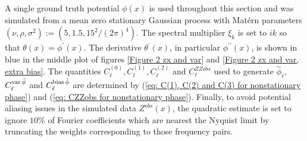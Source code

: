 \documentclass[10pt,noinfoline]{imsart}
\begin{document}
A single ground truth potential $\phi(x)$ is used throughout this section and was simulated from a mean zero stationary Gaussian process with Mat\'ern parameters $(\nu, \rho, \sigma^2):=(5, 1.5, 15^2 / (2\pi)^4)$. The spectral multiplier $\xi_k$ is set to $ik$ so that $\theta(x) = \phi^\prime(x) $.  The derivative $\theta^\prime(x)$, in particular $\phi^{\prime\prime}(x)$, is shown in blue in the middle plot of figures \ref{Figure 2 zx and var} and \ref{Figure 2 zx and var, extra bias}.  
The quantities $C^{(0)}_\ell, C^{(1)}_\ell, C^{(2)}_\ell$ and $C^{ZZobs}_\ell$ used to generate  $\hat\phi_\ell$, $C^{\text{var\,}\hat\phi}_{\ell}$ and $C^{\text{bias\,}\hat\phi}_{\ell}$ are determined by (\ref{eq: C(1), C(2) and C(3) for nonstationary phase}) and (\ref{eq: CZZobs for nonstationary phase}). Finally, to avoid potential aliasing issues in the simulated data $Z^{obs}(x)$, the quadratic estimate is set to ignore $10\%$ of Fourier coefficients which are nearest the Nyquist limit by truncating the weights corresponding to those frequency pairs.
\end{document}
